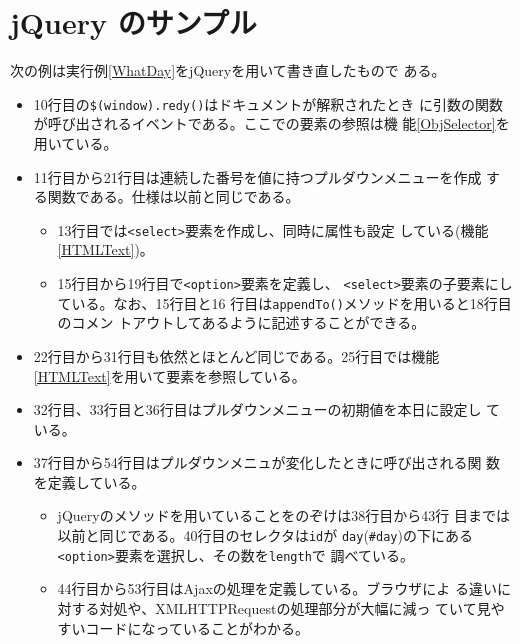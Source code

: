 \section{jQuery のサンプル}
 \begin{Exec}\upshape
  次の例は実行例\ref{WhatDay}をjQueryを用いて書き直したもので
 ある。
 \begin{itemize}
  \item 10行目の\texttt{\$(window).redy()}はドキュメントが解釈されたとき
	に引数の関数が呼び出されるイベントである。ここでの要素の参照は機
	能\ref{ObjSelector}を用いている。
  \item 11行目から21行目は連続した番号を値に持つプルダウンメニューを作成
	する関数である。仕様は以前と同じである。
	\begin{itemize}
	 \item 13行目では\texttt{<select>}要素を作成し、同時に属性も設定
	       している(機能\ref{HTMLText})。
	 \item 15行目から19行目で\texttt{<option>}要素を定義し、
	       \texttt{<select>}要素の子要素にしている。なお、15行目と16
	       行目は\texttt{appendTo()}メソッドを用いると18行目のコメン
	       トアウトしてあるように記述することができる。
	\end{itemize}
  \item 22行目から31行目も依然とほとんど同じである。25行目では機能
	\ref{HTMLText}を用いて要素を参照している。
  \item 32行目、33行目と36行目はプルダウンメニューの初期値を本日に設定し
	ている。
  \item 37行目から54行目はプルダウンメニュが変化したときに呼び出される関
	数を定義している。
	\begin{itemize}
	 \item jQueryのメソッドを用いていることをのぞけは38行目から43行
	       目までは以前と同じである。40行目のセレクタは\texttt{id}が
	       \texttt{day}(\texttt{\#day})の下にある
	       \texttt{<option>}要素を選択し、その数を\texttt{length}で
	       調べている。
	 \item 44行目から53行目はAjaxの処理を定義している。ブラウザによ
	       る違いに対する対処や、XMLHTTPRequestの処理部分が大幅に減っ
	       ていて見やすいコードになっていることがわかる。
	\end{itemize}
 \end{itemize}
 \end{Exec}

